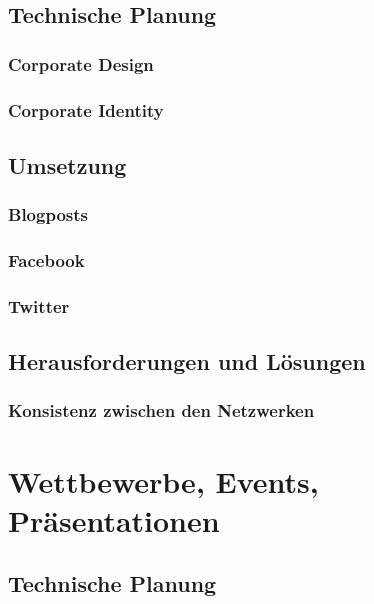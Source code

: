   \subsection{Technische Planung}

    \subsubsection{Corporate Design}

    \subsubsection{Corporate Identity}

  \subsection{Umsetzung}

    \subsubsection{Blogposts}

    \subsubsection{Facebook}

    \subsubsection{Twitter}

  \subsection{Herausforderungen und Lösungen}

    \subsubsection{Konsistenz zwischen den Netzwerken}

\section{Wettbewerbe, Events, Präsentationen}

  \subsection{Technische Planung}

